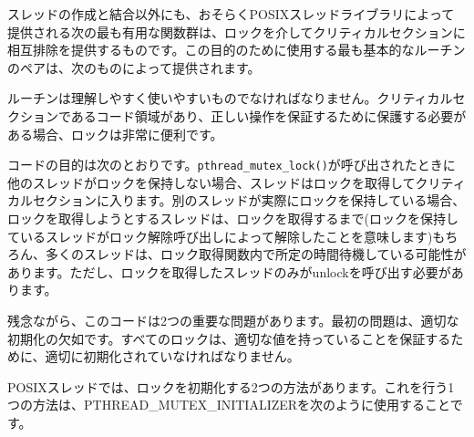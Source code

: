 スレッドの作成と結合以外にも、おそらくPOSIXスレッドライブラリによって提供される次の最も有用な関数群は、ロックを介してクリティカルセクションに相互排除を提供するものです。この目的のために使用する最も基本的なルーチンのペアは、次のものによって提供されます。

\begin{Shaded}
\begin{Highlighting}[]
\end{Highlighting}
\end{Shaded}

ルーチンは理解しやすく使いやすいものでなければなりません。クリティカルセクションであるコード領域があり、正しい操作を保証するために保護する必要がある場合、ロックは非常に便利です。

\begin{Shaded}
\begin{Highlighting}[]
\NormalTok{; }
\end{Highlighting}
\end{Shaded}

コードの目的は次のとおりです。\texttt{pthread\_mutex\_lock()}が呼び出されたときに他のスレッドがロックを保持しない場合、スレッドはロックを取得してクリティカルセクションに入ります。別のスレッドが実際にロックを保持している場合、ロックを取得しようとするスレッドは、ロックを取得するまで(ロックを保持しているスレッドがロック解除呼び出しによって解除したことを意味します)もちろん、多くのスレッドは、ロック取得関数内で所定の時間待機している可能性があります。ただし、ロックを取得したスレッドのみがunlockを呼び出す必要があります。

残念ながら、このコードは2つの重要な問題があります。最初の問題は、適切な初期化の欠如です。すべてのロックは、適切な値を持っていることを保証するために、適切に初期化されていなければなりません。

POSIXスレッドでは、ロックを初期化する2つの方法があります。これを行う1つの方法は、PTHREAD\_MUTEX\_INITIALIZERを次のように使用することです。

\begin{Shaded}
\begin{Highlighting}[]
\end{Highlighting}
\end{Shaded}

